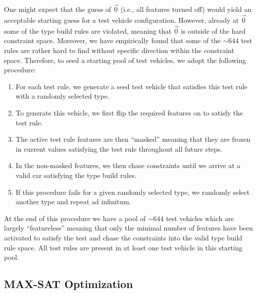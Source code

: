 \documentclass[aps,pra,twocolumn,superscriptaddress,groupedaddress]{revtex4}  %
\begin{document}
One might expect that the guess of $\vec 0$ (i.e., all features turned off)
would yield an acceptable starting guess for a test vehicle configuration.
However, already at $\vec 0$ some of the type build rules are violated, meaning
that $\vec 0$ is outside of the hard constraint space. Moreover, we have
empirically found that some of the $\sim 644$ test rules are rather hard to find
without specific direction within the constraint space. Therefore, to seed a
starting pool of test vehicles, we adopt the following procedure:
\begin{enumerate}
\item For each test rule, we generate a seed test vehicle that satisfies this
test rule with a randomly selected type.
\item To generate this vehicle, we first flip the required features on to
satisfy the test rule. 
\item The active test rule features are then ``masked'' meaning that they are
frozen in current values satisfying the test rule throughout all future steps.
\item In the non-masked features, we then chase constraints until we arrive at a
valid car satisfying the type build rules.
\item If this procedure fails for a given randomly selected type, we randomly
select another type and repeat ad infinitum.
\end{enumerate}
At the end of this procedure we have a pool of $\sim 644$ test vehicles which
are largely ``featureless'' meaning that only the minimal number of features
have been activated to satisfy the test and chase the constraints into the valid
type build rule space. All test rules are present in at least one test vehicle in this
starting pool.

\subsection{MAX-SAT Optimization}
\end{document}
